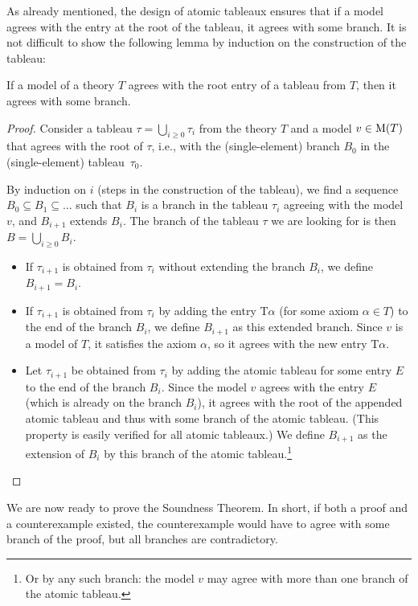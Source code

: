 As already mentioned, the design of atomic tableaux ensures that if a model agrees with the entry at the root of the tableau, it agrees with some branch. It is not difficult to show the following lemma by induction on the construction of the tableau:
\begin{lemma}\label{lemma:agrees-with-branch}
    If a model of a theory $T$ agrees with the root entry of a tableau from $T$, then it agrees with some branch.
\end{lemma}
\begin{proof}
    Consider a tableau $\tau = \bigcup_{i \geq 0} \tau_i$ from the theory $T$ and a model $v \in \operatorname{M}(T)$ that agrees with the root of $\tau$, i.e., with the (single-element) branch $B_0$ in the (single-element) tableau~$\tau_0$.
    
    By induction on $i$ (steps in the construction of the tableau), we find a sequence $B_0 \subseteq B_1 \subseteq \dots$ such that $B_i$ is a branch in the tableau $\tau_i$ agreeing with the model $v$, and $B_{i+1}$ extends $B_i$. The branch of the tableau $\tau$ we are looking for is then $B = \bigcup_{i \geq 0} B_i$.
    
    \begin{itemize}
        \item If $\tau_{i+1}$ is obtained from $\tau_i$ without extending the branch $B_i$, we define $B_{i+1} = B_i$.
        \item If $\tau_{i+1}$ is obtained from $\tau_i$ by adding the entry $\mathrm{T}\alpha$ (for some axiom $\alpha \in T$) to the end of the branch $B_i$, we define $B_{i+1}$ as this extended branch. Since $v$ is a model of $T$, it satisfies the axiom $\alpha$, so it agrees with the new entry $\mathrm{T}\alpha$.
        \item Let $\tau_{i+1}$ be obtained from $\tau_i$ by adding the atomic tableau for some entry $E$ to the end of the branch $B_i$. Since the model $v$ agrees with the entry $E$ (which is already on the branch $B_i$), it agrees with the root of the appended atomic tableau and thus with some branch of the atomic tableau. (This property is easily verified for all atomic tableaux.) We define $B_{i+1}$ as the extension of $B_i$ by this branch of the atomic tableau.\footnote{Or by any such branch: the model $v$ may agree with more than one branch of the atomic tableau.}
    \end{itemize}
\end{proof}

We are now ready to prove the Soundness Theorem. In short, if both a proof and a counterexample existed, the counterexample would have to agree with some branch of the proof, but all branches are contradictory.

